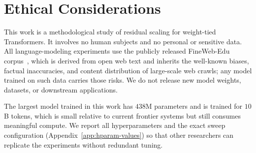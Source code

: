 \section*{Ethical Considerations}

This work is a methodological study of residual scaling for weight-tied Transformers. It involves no human subjects and no personal or sensitive data. All language-modeling experiments use the publicly released FineWeb-Edu corpus~\citep{penedo2024fineweb}, which is derived from open web text and inherits the well-known biases, factual inaccuracies, and content distribution of large-scale web crawls; any model trained on such data carries those risks. We do not release new model weights, datasets, or downstream applications.

The largest model trained in this work has $438$M parameters and is trained for $10$B tokens, which is small relative to current frontier systems but still consumes meaningful compute. We report all hyperparameters and the exact sweep configuration (Appendix~\ref{app:hparam-values}) so that other researchers can replicate the experiments without redundant tuning.
